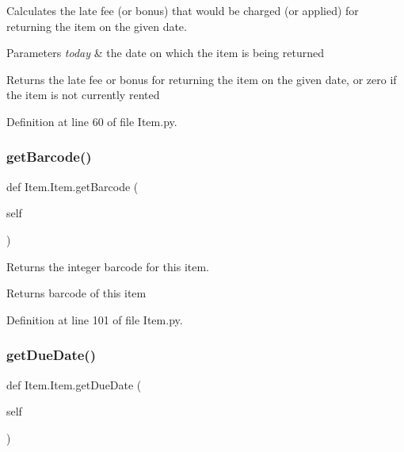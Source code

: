 Calculates the late fee (or bonus) that would be charged (or applied) for returning the item on the given date. 


\begin{DoxyParams}{Parameters}
{\em today} & the date on which the item is being returned \\
\hline
\end{DoxyParams}
\begin{DoxyReturn}{Returns}
the late fee or bonus for returning the item on the given date, or zero if the item is not currently rented 
\end{DoxyReturn}


Definition at line 60 of file Item.\+py.

\mbox{\label{classItem_1_1Item_ac53c971f8932eb428ee5a9999ba8c541}} 
\subsubsection{\texorpdfstring{get\+Barcode()}{getBarcode()}}
{\footnotesize\ttfamily def Item.\+Item.\+get\+Barcode (\begin{DoxyParamCaption}\item[{}]{self }\end{DoxyParamCaption})}



Returns the integer barcode for this item. 

\begin{DoxyReturn}{Returns}
barcode of this item 
\end{DoxyReturn}


Definition at line 101 of file Item.\+py.

\mbox{\label{classItem_1_1Item_a14c6c86e71412609102c9fb0cd009751}} 
\subsubsection{\texorpdfstring{get\+Due\+Date()}{getDueDate()}}
{\footnotesize\ttfamily def Item.\+Item.\+get\+Due\+Date (\begin{DoxyParamCaption}\item[{}]{self }\end{DoxyParamCaption})}



